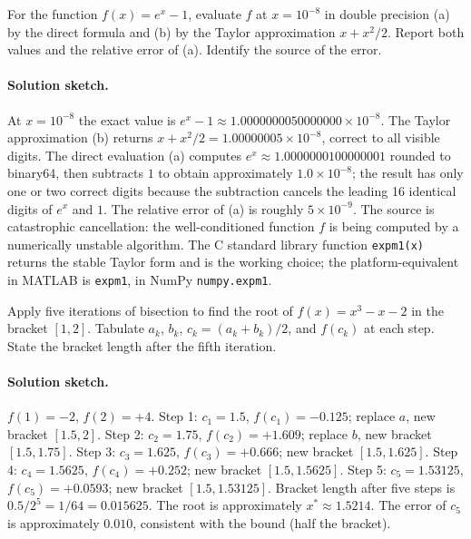\begin{exercise}
For the function $f(x) = e^{x} - 1$, evaluate $f$ at $x = 10^{-8}$
in double precision (a) by the direct formula and (b) by the
Taylor approximation $x + x^{2}/2$. Report both values and the
relative error of (a). Identify the source of the error.
\end{exercise}

\paragraph{Solution sketch.}
At $x = 10^{-8}$ the exact value is $e^{x} - 1
\approx 1.0000000050000000 \times 10^{-8}$. The Taylor approximation
(b) returns $x + x^{2}/2 = 1.00000005 \times 10^{-8}$, correct to
all visible digits. The direct evaluation (a) computes
$e^{x} \approx 1.0000000100000001$ rounded to binary64, then
subtracts $1$ to obtain approximately $1.0 \times 10^{-8}$; the
result has only one or two correct digits because the subtraction
cancels the leading 16 identical digits of $e^{x}$ and $1$. The
relative error of (a) is roughly $5 \times 10^{-9}$. The source is
catastrophic cancellation: the well-conditioned function $f$ is
being computed by a numerically unstable algorithm. The C standard
library function \texttt{expm1(x)} returns the stable Taylor form
and is the working choice; the platform-equivalent in MATLAB is
\texttt{expm1}, in NumPy \texttt{numpy.expm1}.

\begin{exercise}
Apply five iterations of bisection to find the root of $f(x) =
x^{3} - x - 2$ in the bracket $[1, 2]$. Tabulate $a_{k}$, $b_{k}$,
$c_{k} = (a_{k} + b_{k})/2$, and $f(c_{k})$ at each step. State
the bracket length after the fifth iteration.
\end{exercise}

\paragraph{Solution sketch.}
$f(1) = -2$, $f(2) = +4$. Step 1: $c_{1} = 1.5$,
$f(c_{1}) = -0.125$; replace $a$, new bracket $[1.5, 2]$.
Step 2: $c_{2} = 1.75$, $f(c_{2}) = +1.609$; replace $b$, new
bracket $[1.5, 1.75]$.
Step 3: $c_{3} = 1.625$, $f(c_{3}) = +0.666$; new bracket
$[1.5, 1.625]$.
Step 4: $c_{4} = 1.5625$, $f(c_{4}) = +0.252$; new bracket
$[1.5, 1.5625]$.
Step 5: $c_{5} = 1.53125$, $f(c_{5}) = +0.0593$; new bracket
$[1.5, 1.53125]$. Bracket length after five steps is
$0.5 / 2^{5} = 1/64 = 0.015625$. The root is approximately
$x^{*} \approx 1.5214$. The error of $c_{5}$ is approximately
$0.010$, consistent with the bound (half the bracket).

